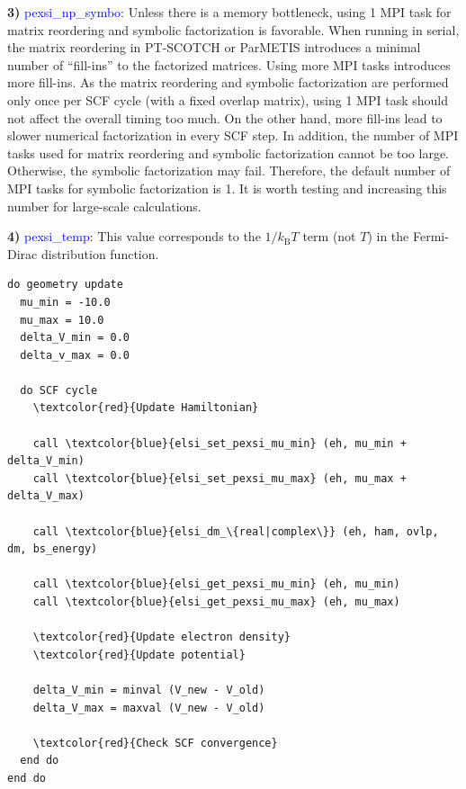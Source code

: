 \documentclass{report}
\begin{document}
\textbf{3)} \textcolor{blue}{pexsi\_np\_symbo}:  Unless there is a memory bottleneck, using 1 MPI task for matrix reordering and symbolic factorization is favorable.  When running in serial, the matrix reordering in PT-SCOTCH or ParMETIS introduces a minimal number of ``fill-ins'' to the factorized matrices.  Using more MPI tasks introduces more fill-ins.  As the matrix reordering and symbolic factorization are performed only once per SCF cycle (with a fixed overlap matrix), using 1 MPI task should not affect the overall timing too much.  On the other hand, more fill-ins lead to slower numerical factorization in every SCF step.  In addition, the number of MPI tasks used for matrix reordering and symbolic factorization cannot be too large.  Otherwise, the symbolic factorization may fail.  Therefore, the default number of MPI tasks for symbolic factorization is 1.  It is worth testing and increasing this number for large-scale calculations.

\textbf{4)} \textcolor{blue}{pexsi\_temp}:  This value corresponds to the $1/k_\text{B} T$ term (not $T$) in the Fermi-Dirac distribution function.

\begin{tcolorbox}
\begin{Verbatim}[commandchars=\\\{\}]
do geometry update
  mu_min = -10.0
  mu_max = 10.0
  delta_V_min = 0.0
  delta_v_max = 0.0

  do SCF cycle
    \textcolor{red}{Update Hamiltonian}

    call \textcolor{blue}{elsi_set_pexsi_mu_min} (eh, mu_min + delta_V_min)
    call \textcolor{blue}{elsi_set_pexsi_mu_max} (eh, mu_max + delta_V_max)

    call \textcolor{blue}{elsi_dm_\{real|complex\}} (eh, ham, ovlp, dm, bs_energy)

    call \textcolor{blue}{elsi_get_pexsi_mu_min} (eh, mu_min)
    call \textcolor{blue}{elsi_get_pexsi_mu_max} (eh, mu_max)

    \textcolor{red}{Update electron density}
    \textcolor{red}{Update potential}

    delta_V_min = minval (V_new - V_old)
    delta_V_max = maxval (V_new - V_old)

    \textcolor{red}{Check SCF convergence}
  end do
end do
\end{Verbatim}
\end{tcolorbox}
\end{document}
